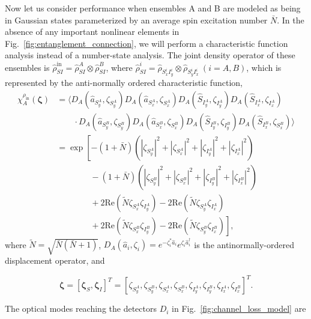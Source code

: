 \documentclass[aps,twocolumn,secnumarabic,amsmath,amssymb,pra,groupedaddress,
showpacs, showkeys]{revtex4-1}
\newcommand{\pna}[1]{\left(#1\right)}
\newcommand{\pnb}[1]{\left[#1\right]}
\newcommand{\eqn}[1]{
\begin{equation}
	#1
\end{equation}
}
\begin{document}
Now let us consider performance when ensembles A and B are modeled as being in
Gaussian states parameterized by an average spin excitation number
$\bar{N}$. In the absence of any important nonlinear elements in
Fig.~\ref{fig:entanglement_connection}, we will perform a characteristic
function analysis instead of a number-state analysis. The joint density
operator of these ensembles is
$\hat{\rho}_{SI}^{\textrm{in}}=\hat{\rho}_{SI}^A\otimes \hat{\rho}_{SI}^B$,
where $\hat{\rho}_{SI}^i=\hat{\rho}_{S_x^i I_y^i}\otimes\hat{\rho}_{S_y^i
  I_x^i}~\pna{i=A,B}$, which is represented by the anti-normally ordered
characteristic function,
\begin{align}
    \chi_A^{\rho_{\textrm{in}}}\pna{\bm{\zeta}} 
    & =  \langle D_A\pna{\hat{a}_{S_y^A},\zeta_{S_y^A}}
        D_A\pna{\hat{a}_{S_x^A},\zeta_{S_x^A}}
        D_A\pna{\hat{S}_{I_y^A},\zeta_{I_y^A}}
        D_A\pna{\hat{S}_{I_x^A},\zeta_{I_x^A}} \nonumber \\
    & \qquad \cdot D_A\pna{\hat{a}_{S_y^B},\zeta_{S_y^B}}
            D_A\pna{\hat{a}_{S_x^B},\zeta_{S_x^B}}
            D_A\pna{\hat{S}_{I_y^B},\zeta_{I_y^B}}
            D_A\pna{\hat{S}_{I_x^B},\zeta_{S_x^B}}\rangle \nonumber \\
    & = \exp\left[-\pna{1+\bar{N}}\pna{|\zeta_{S_y^A}|^2+|\zeta_{S_x^A}|^2+|\zeta_{I_y^A}|^2+|\zeta_{I_x^A}|^2} \right.\nonumber \\
    & \qquad \qquad \left.{}-\pna{1+\bar{N}}\pna{|\zeta_{S_y^B}|^2+|\zeta_{S_x^B}|^2+|\zeta_{I_y^B}|^2+|\zeta_{I_x^B}|^2}\right.\nonumber \\ 
    & \qquad \qquad \left. {} +2\textrm{Re}\pna{\tilde{N}\zeta_{S_x^A} \zeta_{I_y^A}}-2\textrm{Re}\pna{\tilde{N}\zeta_{S_y^A} \zeta_{I_x^A}}\right.\nonumber \\
    & \qquad \qquad \left. {} +2\textrm{Re}\pna{\tilde{N}\zeta_{S_x^B} \zeta_{I_y^B}}-2\textrm{Re}\pna{\tilde{N}\zeta_{S_y^B} \zeta_{I_x^B}}\right], 
\end{align}
where $\tilde{N}=\sqrt{\bar{N}\pna{\bar{N}+1}}$,
$D_A\pna{\hat{a}_i,\zeta_i}=e^{-\zeta_i^* \hat{a}_i}e^{\zeta_i
  \hat{a}_i^{\dagger}}$ is the antinormally-ordered displacement operator, and
\eqn{
\bm{\zeta} = \pnb{\bm{\zeta}_S, \bm{\zeta}_I}^T= \pnb{\zeta_{S^A_y},\zeta_{S^B_y},\zeta_{S^A_x},\zeta_{S^B_x},
\zeta_{I^A_y},\zeta_{I^B_y},\zeta_{I^A_x},\zeta_{I^B_x}}^{T}.
}
The optical modes reaching the detectors $D_i$ in
Fig.~\ref{fig:channel_loss_model} are
\end{document}
